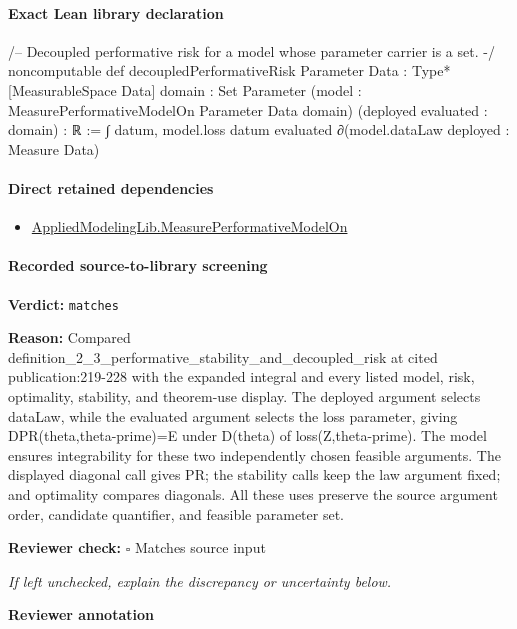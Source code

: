 \documentclass[10pt]{article}
\newcommand{\reviewerbox}{%
  \par\noindent\fbox{\parbox{0.96\linewidth}{\rule{0pt}{0.38in}}}\par
}
\newcommand{\reviewmatch}[1]{%
  \par\noindent\textbf{Reviewer check:} $\square$\; #1\par
  \noindent\emph{If left unchecked, explain the discrepancy or uncertainty below.}\par
}
\begin{document}
\paragraph{Exact Lean library declaration}
\begin{ReviewVerbatim}
/-- Decoupled performative risk for a model whose parameter carrier is a set. -/
noncomputable def decoupledPerformativeRisk
    {Parameter Data : Type*} [MeasurableSpace Data] {domain : Set Parameter}
    (model : MeasurePerformativeModelOn Parameter Data domain)
    (deployed evaluated : domain) : ℝ :=
  ∫ datum, model.loss datum evaluated ∂(model.dataLaw deployed : Measure Data)
\end{ReviewVerbatim}

\paragraph{Direct retained dependencies}
\begin{itemize}\raggedright
\item \hyperlink{library-prerequisite-e14cc5e8b1e1460e}{Applied\allowbreak{}Modeling\allowbreak{}Lib.\allowbreak{}Measure\allowbreak{}Performative\allowbreak{}Model\allowbreak{}On}
\end{itemize}
\paragraph{Recorded source-to-library screening}
\textbf{Verdict:} \texttt{matches}
\\
{\raggedright
\textbf{Reason:} Compared definition\_\allowbreak{}2\_\allowbreak{}3\_\allowbreak{}performative\_\allowbreak{}stability\_\allowbreak{}and\_\allowbreak{}decoupled\_\allowbreak{}risk at cited publication:\allowbreak{}219-\allowbreak{}228 with the expanded integral and every listed model, risk, optimality, stability, and theorem-\allowbreak{}use display.\allowbreak{} The deployed argument selects dataLaw, while the evaluated argument selects the loss parameter, giving DPR(theta,theta-\allowbreak{}prime)=E under D(theta) of loss(Z,theta-\allowbreak{}prime).\allowbreak{} The model ensures integrability for these two independently chosen feasible arguments.\allowbreak{} The displayed diagonal call gives PR;\allowbreak{} the stability calls keep the law argument fixed;\allowbreak{} and optimality compares diagonals.\allowbreak{} All these uses preserve the source argument order, candidate quantifier, and feasible parameter set.\allowbreak{}
\par}
\reviewmatch{Matches source input}
\noindent\textbf{Reviewer annotation}\par
\reviewerbox
\clearpage
\hypertarget{library-prerequisite-8eef8d8ba05e7ebe}{}
\end{document}
